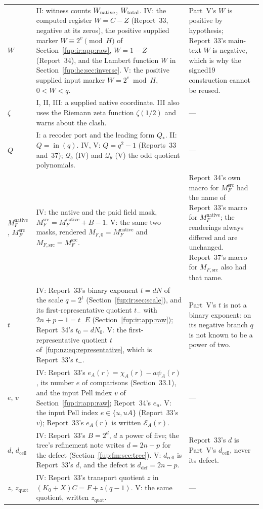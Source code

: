 \documentclass[11pt,letterpaper]{article}
\theoremstyle{definition}\newtheorem{definition}[theorem]{Definition}
\theoremstyle{remark}\newtheorem{remark}[theorem]{Remark}
\newcommand{\topf}[1]{\operatorname{in}(#1)}
\newcommand{\MFnat}{M_{F}^{\mathrm{native}}}
\newcommand{\MFsrc}{M_F^{\mathrm{src}}}
\newcommand{\ea}{e_A}
\newcommand{\dcell}{d_{\mathrm{cell}}}
\newcommand{\MFsrcV}{M_{F,\mathrm{src}}}
\newcommand{\MFnatV}{M_{F,0}}
\newcommand{\zquot}{z_{\mathrm{quot}}}\newcommand{\ga}{g_a}
\begin{document}
{\begin{longtable}{@{}p{}p{}p{}@{}}
$W$ & II: witness counts $W_{\rm native}$, $W_{\rm total}$. IV: the computed register $W=C-Z$ (Report~33, negative at its zeros), the positive supplied marker $W\equiv2^v\pmod H$ of Section~\ref{fup:ir:app:raw}, $W=1-Z$ (Report~34), and the Lambert function $W$ in Section~\ref{fup:hc:sec:inverse}. V: the positive supplied input marker $W=2^e\bmod H$, $0<W<q$. & Part~V's $W$ is positive by hypothesis; Report~33's main-text $W$ is negative, which is why the signed19 construction cannot be reused.\\
$\zeta$ & I, II, III: a supplied native coordinate. III also uses the Riemann zeta function $\zeta(1/2)$ and warns about the clash. & ---\\
$Q$ & I: a recoder port and the leading form $Q_*$. II: $Q=\topf{q}$. IV, V: $Q=q^2-1$ (Reports~33 and~37); $\mathcal Q_b$ (IV) and $\mathcal Q_\theta$ (V) the odd quotient polynomials. & ---\\
$\MFnat$, $\MFsrc$ & IV: the native and the paid field mask, $\MFsrc=\MFnat+B-1$. V: the same two masks, rendered $\MFnatV=\MFnat$ and $\MFsrcV=\MFsrc$. & Report~34's own macro for $\MFsrc$ had the name of Report~33's macro for $\MFnat$; the renderings always differed and are unchanged. Report~37's macro for $\MFsrcV$ also had that name.\\
$t$ & IV: Report~33's binary exponent $t=dN$ of the scale $q=2^t$ (Section~\ref{fup:ir:sec:scale}), and its first-representative quotient $t_-$ with $2n+p-1=t_-E$ (Section~\ref{fup:ir:app:raw}); Report~34's $t_0=dN_0$. V: the first-representative quotient $t$ of~\eqref{fup:nz:eq:representative}, which is Report~33's $t_-$. & Part~V's $t$ is not a binary exponent: on its negative branch $q$ is not known to be a power of two.\\
$e$, $v$ & IV: Report~33's $\ea(r)=\chi_A(r)-a\psi_A(r)$, its number $e$ of comparisons (Section~33.1), and the input Pell index $v$ of Section~\ref{fup:ir:app:raw}; Report~34's $e_u$. V: the input Pell index $e\in\{u,uA\}$ (Report~33's $v$); Report~33's $\ea(r)$ is written $\mathcal E_A(r)$. & ---\\
$d$, $\dcell$ & IV: Report~33's $B=2^d$, $d$ a power of five; the tree's refinement note writes $d=2n-p$ for the defect (Section~\ref{fup:fm:sec:tree}). V: $\dcell$ is Report~33's $d$, and the defect is $d_{\mathrm{def}}=2n-p$. & Report~33's $d$ is Part~V's $\dcell$, never its defect.\\
$z$, $\zquot$ & IV: Report~33's transport quotient $z$ in $(K_0+X)C=F+z(q-1)$. V: the same quotient, written $\zquot$. & ---\\

\end{longtable}}
\end{document}
